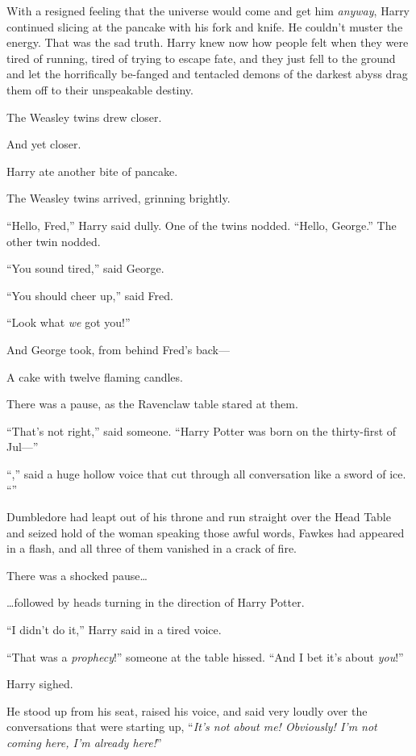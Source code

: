 With a resigned feeling that the universe would come and get him \emph{anyway}, Harry continued slicing at the pancake with his fork and knife. He couldn’t muster the energy. That was the sad truth. Harry knew now how people felt when they were tired of running, tired of trying to escape fate, and they just fell to the ground and let the horrifically be-fanged and tentacled demons of the darkest abyss drag them off to their unspeakable destiny.

The Weasley twins drew closer.

And yet closer.

Harry ate another bite of pancake.

The Weasley twins arrived, grinning brightly.

“Hello, Fred,” Harry said dully. One of the twins nodded. “Hello, George.” The other twin nodded.

“You sound tired,” said George.

“You should cheer up,” said Fred.

“Look what \emph{we} got you!”

And George took, from behind Fred’s back—

A cake with twelve flaming candles.

There was a pause, as the Ravenclaw table stared at them.

“That’s not right,” said someone. “Harry Potter was born on the thirty-first of Jul—”

“,” said a huge hollow voice that cut through all conversation like a sword of ice. “”

Dumbledore had leapt out of his throne and run straight over the Head Table and seized hold of the woman speaking those awful words, Fawkes had appeared in a flash, and all three of them vanished in a crack of fire.

There was a shocked pause…

…followed by heads turning in the direction of Harry Potter.

“I didn’t do it,” Harry said in a tired voice.

“That was a \emph{prophecy}!” someone at the table hissed. “And I bet it’s about \emph{you}!”

Harry sighed.

He stood up from his seat, raised his voice, and said very loudly over the conversations that were starting up, “\emph{It’s not about me! Obviously! I’m not coming here, I’m already here!}”

